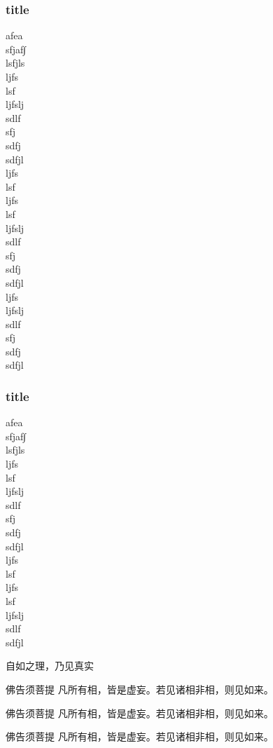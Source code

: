 \documentclass[no-math, xcolor=table]{beamer} %
\begin{document}
\begin{frame}[t, allowframebreaks]\frametitle{title}
	afea\\
	sfjaf∫\\
	lsfjls\\
	ljfs\\
	lsf\\
	ljfslj\\
	sdlf\\
	sfj\\
	sdfj\\
	sdfjl\\
	ljfs\\
	lsf\\
	ljfs\\
	lsf\\
	ljfslj\\
	sdlf\\
	sfj\\
	sdfj\\
	sdfjl\\
	ljfs\\
	ljfslj\\
	sdlf\\
	sfj\\
	sdfj\\
	sdfjl
\end{frame}

\begin{frame}[shrink=5]\frametitle{title}
	afea\\
	sfjaf∫\\
	lsfjls\\
	ljfs\\
	lsf\\
	ljfslj\\
	sdlf\\
	sfj\\
	sdfj\\
	sdfjl\\
	ljfs\\
	lsf\\
	ljfs\\
	lsf\\
	ljfslj\\
	sdlf\\
	sdfjl
\end{frame}


\begin{frame}{自如之理，乃见真实}
	\begin{block}{佛告须菩提}
	凡所有相，皆是虚妄。若见诸相非相，则见如来。
	\end{block}

	\begin{alertblock}{佛告须菩提}
	凡所有相，皆是虚妄。若见诸相非相，则见如来。
	\end{alertblock}

	\begin{exampleblock}{佛告须菩提}
	凡所有相，皆是虚妄。若见诸相非相，则见如来。
	\end{exampleblock} 
\end{frame}
\end{document}
